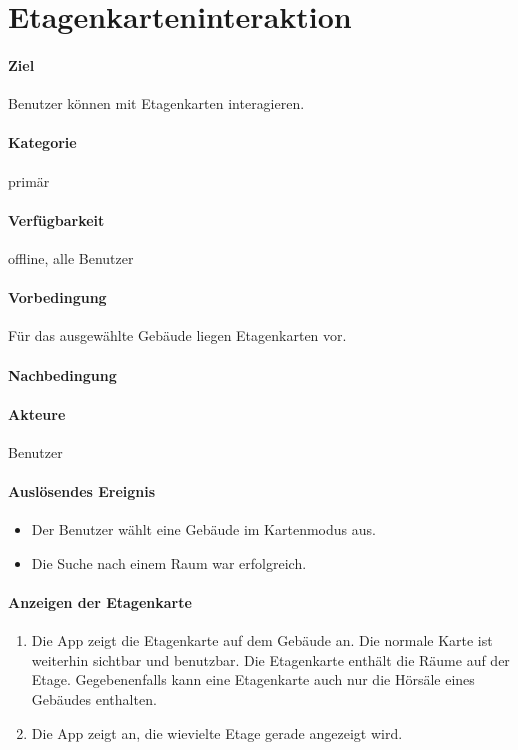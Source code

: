 \section{Etagenkarteninteraktion}
\paragraph{Ziel}
Benutzer können mit Etagenkarten interagieren.
\paragraph{Kategorie}
primär
\paragraph{Verfügbarkeit}
offline, alle Benutzer
\paragraph{Vorbedingung}
Für das ausgewählte Gebäude liegen Etagenkarten vor.
\paragraph{Nachbedingung}

\paragraph{Akteure}
Benutzer
\paragraph{Auslösendes Ereignis}
\begin{itemize}
    \item Der Benutzer wählt eine Gebäude im Kartenmodus aus.
    \item Die Suche nach einem Raum war erfolgreich.
\end{itemize}
 
\paragraph{Anzeigen der Etagenkarte}
\begin{enumerate}
    \item Die App zeigt die Etagenkarte auf dem Gebäude an. Die normale Karte ist weiterhin sichtbar und benutzbar. Die Etagenkarte enthält die Räume auf der Etage. Gegebenenfalls kann eine Etagenkarte auch nur die Hörsäle eines Gebäudes enthalten.
    \item Die App zeigt an, die wievielte Etage gerade angezeigt wird.
\end{enumerate}
